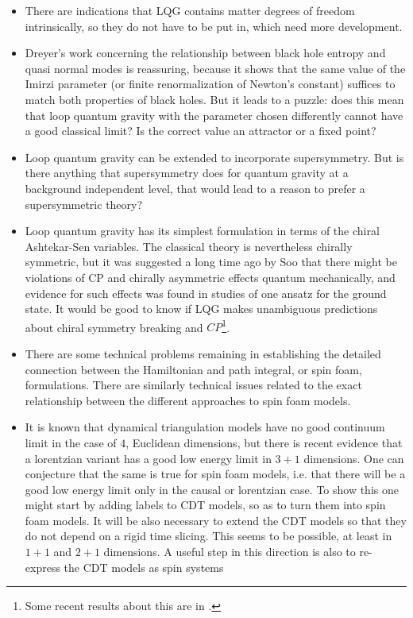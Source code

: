 \documentclass[12pt]{article}
\begin{document}
\begin{itemize}
\item{} There are indications that LQG contains matter degrees of
freedom intrinsically, so they do not have to be put in, which
need more development\cite{unify,sundance,louis-matter}.  

    
    \item{}Dreyer's work concerning the relationship between black 
    hole entropy and quasi normal modes\cite{olaf-bh} is reassuring, because it 
    shows that the same value of the Imirzi parameter (or finite 
    renormalization of Newton's constant) suffices to match both 
    properties of black holes. But it leads to a puzzle: does this 
    mean that loop quantum gravity with the parameter chosen 
    differently cannot have a good classical limit?  Is the correct 
    value an attractor or a fixed point?  
    
    \item{}Loop quantum gravity can be extended to incorporate 
    supersymmetry. But is there anything that supersymmetry does for quantum 
    gravity at a background independent level, that would lead to a 
    reason to prefer a supersymmetric theory?  
   
    
    \item{}Loop quantum gravity has its simplest formulation in terms 
    of the chiral Ashtekar-Sen variables. The classical theory is 
    nevertheless chirally symmetric, but it was suggested a long time 
    ago by Soo\cite{chopin-thesis} that there might be violations of CP and chirally 
    asymmetric effects quantum mechanically, and evidence for such 
    effects was found in studies of one ansatz for the ground state\cite{GP}.
    It would be good to know if LQG makes unambiguous predictions 
    about chiral symmetry breaking and $CP$\footnote{Some recent
results about this are in \cite{parity}.}.
    
    \item{}There are some technical problems remaining in 
    establishing the detailed connection between the Hamiltonian and 
    path integral, or spin foam, formulations. There are similarly 
    technical issues related to the exact relationship between the 
    different approaches to spin foam models. 

\item{} It is known that dynamical triangulation models have no 
good continuum limit in the case of $4$, Euclidean dimensions\cite{dynamical}, but
there is recent evidence that a lorentzian variant has a good low energy
limit  in $3+1$ dimensions\cite{AL,AL3+1}.  One can conjecture that the
same is true for spin foam models, i.e. that there will be a good
low energy limit only in the causal or lorentzian case. To show this
one might start by adding labels to CDT models, so as to turn them
into spin foam models.  It will be also necessary to 
extend the CDT models
so that they do not depend on a rigid time slicing. This seems to be
possible, at least in $1+1$\cite{fl-cdt} and $2+1$ dimensions\cite{tomasz-cdt}.
A useful step in this direction is also to re-express the CDT models as
spin systems\cite{f-m-CDT}



\end{itemize}
\end{document}
